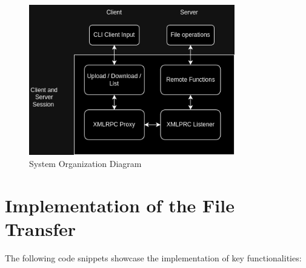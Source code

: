 \documentclass{article}
\begin{document}
	\begin{figure}
		\centering
		\includegraphics[width=0.8\textwidth]{System_Design.png}
		\caption{System Organization Diagram}
		\label{fig:system_organization}
	\end{figure}
	
	\section*{Implementation of the File Transfer}
	The following code snippets showcase the implementation of key functionalities:
	
\end{document}
